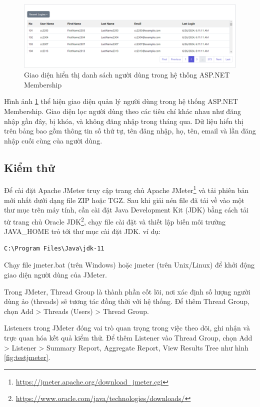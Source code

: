 \documentclass[14pt]{article}
\begin{document}
\begin{figure}
    \centering
    \includegraphics[width=0.8\linewidth]{images/list.png}
    \caption{Giao diện hiển thị danh sách người dùng trong hệ thống ASP.NET Membership}
    \label{fig:list}
\end{figure}

Hình ảnh \ref{fig:list} thể hiện giao diện quản lý người dùng trong hệ thống ASP.NET Membership. Giao diện lọc người dùng theo các tiêu chí khác nhau như đăng nhập gần đây, bị khóa, và không đăng nhập trong tháng qua. Dữ liệu hiển thị trên bảng bao gồm thông tin số thứ tự, tên đăng nhập, họ, tên, email và lần đăng nhập cuối cùng của người dùng.

\subsection{Kiểm thử}

Để cài đặt Apache JMeter truy cập trang chủ Apache JMeter\footnote{\url{https://jmeter.apache.org/download_jmeter.cgi}} và tải phiên bản mới nhất dưới dạng file ZIP hoặc TGZ. Sau khi giải nén file đã tải về vào một thư mục trên máy tính, cần cài đặt Java Development Kit (JDK) bằng cách tải từ trang chủ Oracle JDK\footnote{\url{https://www.oracle.com/java/technologies/downloads/}}, chạy file cài đặt và thiết lập biến môi trường JAVA\_HOME trỏ tới thư mục cài đặt JDK. ví dụ: \begin{verbatim}C:\Program Files\Java\jdk-11\end{verbatim}

Chạy file jmeter.bat (trên Windows) hoặc jmeter (trên Unix/Linux) để khởi động giao diện người dùng của JMeter.

Trong JMeter, Thread Group là thành phần cốt lõi, nơi xác định số lượng người dùng ảo (threads) sẽ tương tác đồng thời với hệ thống. Để thêm Thread Group, chọn Add > Threads (Users) > Thread Group.

Listeners trong JMeter đóng vai trò quan trọng trong việc theo dõi, ghi nhận và trực quan hóa kết quả kiểm thử. Để thêm Listener vào Thread Group, chọn Add > Listener > Summary Report, Aggregate Report, View Results Tree như hình \ref{fig:testjmeter}.
\end{document}
